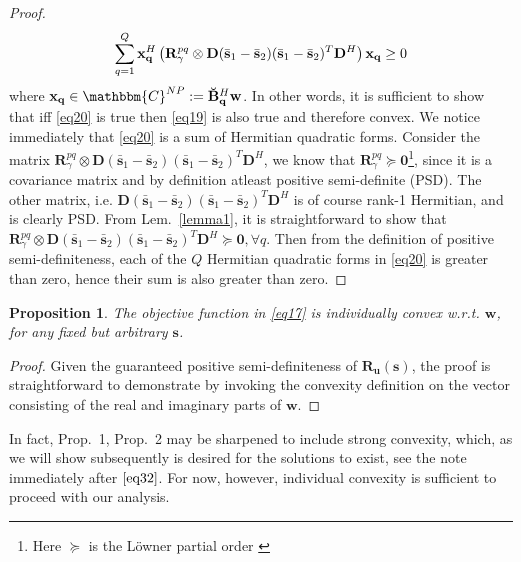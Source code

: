 \documentclass[11pt,draftclsnofoot,onecolumn]{IEEEtran}
\newtheorem{prop}{\bf{Proposition}}
\theoremstyle{definition}
\theoremstyle{remark}
\begin{document}
\begin{proof}
\begin{align} \label{eq20}
\sum\limits_{q=1}^{Q} \mathbf{x}^H_{\bf q} \left(\mathbf{R}_{\gamma}^{pq}\otimes \mathbf{D}(\bar{\mathbf{s}}_1-\bar{\mathbf{s}}_2)(\bar{\mathbf{s}}_1-\bar{\mathbf{s}}_2)^T\mathbf{D}^H\right)\mathbf{x_q} \geq 0
\end{align}
where $\mathbf{x_q}\in\mathbbm{C}^{NP}:=\mathbf{\breve{B}_q}^H\mathbf{w}$. In other words, it is sufficient to show that iff \eqref{eq20} is true then \eqref{eq19} is also true and therefore convex. We notice immediately that \eqref{eq20} is a sum of Hermitian quadratic forms. Consider the matrix $\mathbf{R}_{\gamma}^{pq}\otimes \mathbf{D}(\bar{\mathbf{s}}_1-\bar{\mathbf{s}}_2)(\bar{\mathbf{s}}_1-\bar{\mathbf{s}}_2)^T\mathbf{D}^H$, we know that $\mathbf{R}_{\gamma}^{pq}\succeq \mathbf{0}$\footnote{Here $\succeq$ is the L\"{o}wner partial order \cite{horn1994} }, since it is  a covariance matrix and by definition atleast positive semi-definite (PSD). The other matrix, i.e. $\mathbf{D}(\bar{\mathbf{s}}_1-\bar{\mathbf{s}}_2)(\bar{\mathbf{s}}_1-\bar{\mathbf{s}}_2)^T\mathbf{D}^H$ is of course  rank-1 Hermitian, and is clearly PSD. From Lem.~\ref{lemma1}, it is straightforward to show that $\mathbf{R}_{\gamma}^{pq}\otimes \mathbf{D}(\bar{\mathbf{s}}_1-\bar{\mathbf{s}}_2)(\bar{\mathbf{s}}_1-\bar{\mathbf{s}}_2)^T \mathbf{D}^H\succeq \mathbf{0},\forall q$. Then from the definition of positive semi-definiteness, each of the $Q$ Hermitian quadratic forms in \eqref{eq20} is greater than zero, hence their sum is also greater than zero.
\end{proof}
\begin{prop} \label{propos2}
The objective function in \eqref{eq17} is individually convex w.r.t. $\mathbf{w}$, for any fixed but arbitrary $\mathbf{s}$.
\end{prop}
\begin{proof}
Given the guaranteed positive semi-definiteness of $\mathbf{R_u}(\mathbf{s})$, the proof is straightforward to demonstrate by invoking the convexity definition on the vector consisting of the real and imaginary parts of $\mathbf{w}$.
\end{proof}

In fact, Prop.~1, Prop.~2 may be sharpened to include strong convexity, which, as we will show subsequently is desired for the solutions to exist, see the note immediately after $\eqref{eq32}$.  For now, however, individual convexity is sufficient to proceed with our analysis.
\end{document}

